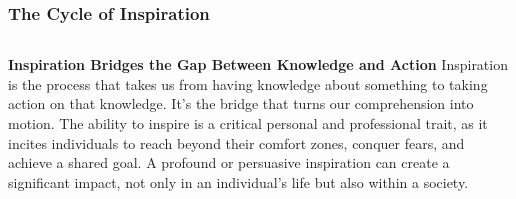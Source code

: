 \documentclass[5pt]{beamer}
\begin{document}
\begin{frame}
\frametitle{The Cycle of Inspiration}
\begin{columns}
\begin{column}{0.7\textwidth}
\begin{block}{\textbf{Inspiration Bridges the Gap Between Knowledge and Action}}
Inspiration is the process that takes us from having knowledge about something to taking action on that knowledge. It's the bridge that turns our comprehension into motion. The ability to inspire is a critical personal and professional trait, as it incites individuals to reach beyond their comfort zones, conquer fears, and achieve a shared goal. A profound or persuasive inspiration can create a significant impact, not only in an individual's life but also within a society.
\end{block}
\end{column}
\end{columns}
\end{frame}
\end{document}

